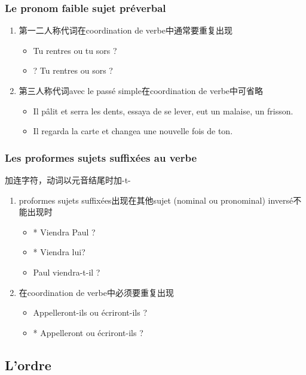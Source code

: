 \documentclass[UTF8]{report}
\begin{document}
\subsubsection{Le pronom faible sujet préverbal}
\begin{enumerate}
    \item 第一二人称代词在coordination de verbe中通常要重复出现
    \begin{itemize}
        \item Tu rentres ou tu sors ?
        \item ? Tu rentres ou sors ?
    \end{itemize}
    \item 第三人称代词avec le passé simple在coordination de verbe中可省略
    \begin{itemize}
        \item Il pâlit et serra les dents, essaya de se lever, eut un malaise, un frisson.
        \item Il regarda la carte et changea une nouvelle fois de ton.
    \end{itemize}
\end{enumerate}

\subsubsection{Les proformes sujets suffixées au verbe}
加连字符，动词以元音结尾时加-t-
\begin{enumerate}
    \item proformes sujets suffixées出现在其他sujet (nominal ou pronominal) inversé不能出现时
    \begin{itemize}
        \item * Viendra Paul ?
        \item * Viendra lui?
        \item Paul viendra-t-il ?
    \end{itemize}
    \item 在coordination de verbe中必须要重复出现
    \begin{itemize}
        \item Appelleront-ils ou écriront-ils ?
        \item * Appelleront ou écriront-ils ?
    \end{itemize}
\end{enumerate}




\subsection{L’ordre}
\end{document}
